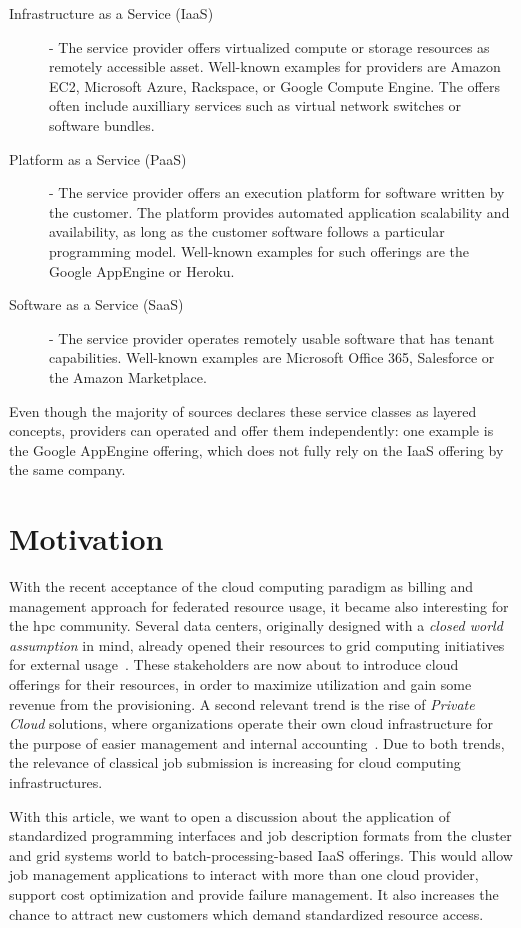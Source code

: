\documentclass[twocolumn]{svjour3}       %
\begin{document}
\begin{description}
\item[Infrastructure as a Service (IaaS)] - The service provider offers virtualized compute or storage resources as remotely accessible asset. Well-known examples for providers are Amazon EC2, Microsoft Azure, Rackspace, or Google Compute Engine. The offers often include auxilliary services such as virtual network switches or software bundles. 
\item[Platform as a Service (PaaS)] - The service provider offers an execution platform for software written by the customer. The platform provides automated application scalability and availability, as long as the customer software follows a particular programming model. Well-known examples for such offerings are the Google AppEngine or Heroku.
\item[Software as a Service (SaaS)] - The service provider operates remotely usable software that has tenant capabilities. Well-known examples are Microsoft Office 365, Salesforce or the Amazon Marketplace. 
\end{description}

Even though the majority of sources declares these service classes as layered concepts, providers can operated and offer them independently: one example is the Google AppEngine offering, which does not fully rely on the IaaS offering by the same company.

\section{Motivation}

With the recent acceptance of the cloud computing paradigm as billing and management approach for federated resource usage, it became also interesting for the \gls{hpc} community. Several data centers, originally designed with a \emph{closed world assumption} in mind, already opened their resources to grid computing initiatives for external usage~\cite{unicore}. These stakeholders are now about to introduce cloud offerings for their resources, in order to maximize utilization and gain some revenue from the provisioning. A second relevant trend is the rise of \emph{Private Cloud} solutions, where organizations operate their own cloud infrastructure for the purpose of easier management and internal accounting~\cite{citemaster_9646}. Due to both trends, the relevance of classical job submission is increasing for cloud computing infrastructures. 

With this article, we want to open a discussion about the application of standardized programming interfaces and job description formats from the cluster and grid systems world to batch-processing-based IaaS offerings. This would allow job management applications to interact with more than one cloud provider, support cost optimization and provide failure management. It also increases the chance to attract new customers which demand standardized resource access.
\end{document}
